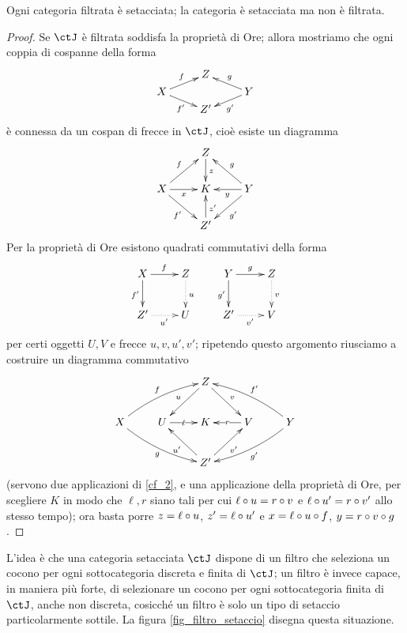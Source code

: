 \begin{theorem}\label{filtr_setacciata}
	Ogni categoria filtrata è setacciata; la categoria \Todo{} è setacciata ma non è filtrata.
\end{theorem}
\begin{proof}
	Se \(\ctJ\) è filtrata soddisfa la proprietà di Ore; allora mostriamo che ogni coppia di cospanne della forma
	\[\xymatrix@R=1mm{
		&Z  & \\
		X \ar[dr]_{f'}\ar[ur]^f&& Y\ar[ul]_g\ar[dl]^{g'}\\
		& Z'
		}\]
	è connessa da un cospan di frecce in \(\ctJ\), cioè esiste un diagramma
	\[\xymatrix@R=7mm{
		&Z\ar[d]^z & \\
		X \ar[r]_x \ar[dr]_{f'}\ar[ur]^f& K & Y\ar[ul]_g\ar[dl]^{g'}\ar[l]^y\\
		& Z'\ar[u]_{z'}
		}\]
	Per la proprietà di Ore esistono quadrati commutativi della forma
	\[\xymatrix{
			X \ar[r]^f\ar[d]_{f'}& Z\ar@{.>}[d]^u & Y \ar[r]^g\ar[d]_{g'}& Z\ar@{.>}[d]^v\\
			Z' \ar@{.>}[r]_{u'} & U & Z' \ar@{.>}[r]_{v'}& V
		}\]
	per certi oggetti \(U,V\) e frecce \(u,v,u',v'\); ripetendo questo argomento riusciamo a costruire un diagramma commutativo
	\[
		\xymatrix{
		&  & Z \ar@{->}[ld]_{u} \ar@{->}[rd]^{v} &  &  \\
		X \ar@/^/@{->}[rru]^{f} \ar@/_/@{->}[rrd]_{g} & U \ar@{->}[r]|-{\ell} & K & V \ar@{->}[l]|-{r} & Y \ar@/_/@{->}[llu]_{f'} \ar@/^/@{->}[lld]^{g'} \\
		&  & Z' \ar@{->}[lu]^{u'} \ar@{->}[ru]_{v'} &  &
		}
	\]
	(servono due applicazioni di \ref{cf_2}, e una applicazione della proprietà di Ore, per scegliere \(K\) in modo che \(\ell,r\) siano tali per cui \(\ell\circ u = r\circ v\) e \(\ell\circ u' = r\circ v'\) allo stesso tempo); ora basta porre \(z = \ell\circ u \), \(z' =	\ell\circ u'\) e \(x = \ell\circ u\circ f\), \(y = r\circ v\circ g\).
\end{proof}
\begin{remark}
	L'idea è che una categoria setacciata \(\ctJ\) dispone di un filtro che seleziona un cocono per ogni sottocategoria discreta e finita di \(\ctJ\); un filtro è invece capace, in maniera più forte, di selezionare un cocono per ogni sottocategoria finita di \(\ctJ\), anche non discreta, cosicché un filtro è solo un tipo di setaccio particolarmente sottile. La figura \ref{fig_filtro_setaccio} disegna questa situazione.
\end{remark}
